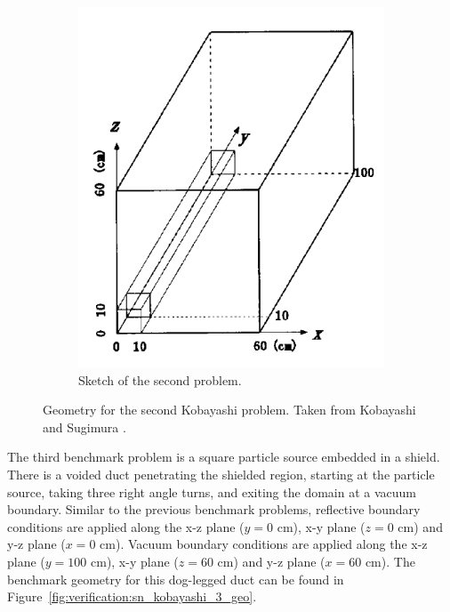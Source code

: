 \begin{figure}[H]
\begin{subfigure}[b]{0.45\textwidth}
        \includegraphics[width=\textwidth]{images/verification/sn_kobayashi/geometry/2_geo_2.png}
        \caption{Sketch of the second problem.}
        \label{fig:verification:sn_kobayashi_2_geo:2}
    \end{subfigure}
    \caption[Geometry for the second Kobayashi problem.]{Geometry for the second Kobayashi problem. Taken from Kobayashi and Sugimura \cite{kobayashi_benchmarks}.}
    \label{fig:verification:sn_kobayashi_2_geo}
\end{figure}
The third benchmark problem is a square particle source embedded in a shield. There is a voided duct penetrating the shielded region, starting at the particle source, taking three right angle turns, and exiting the domain at a vacuum boundary. Similar to the previous benchmark problems, reflective boundary conditions are applied along the x-z plane ($y = 0\text{ cm}$), x-y plane ($z = 0\text{ cm}$) and y-z plane ($x = 0\text{ cm}$). Vacuum boundary conditions are applied along the x-z plane ($y = 100\text{ cm}$), x-y plane ($z = 60\text{ cm}$) and y-z plane ($x = 60\text{ cm}$). The benchmark geometry for this dog-legged duct can be found in Figure~\ref{fig:verification:sn_kobayashi_3_geo}.
